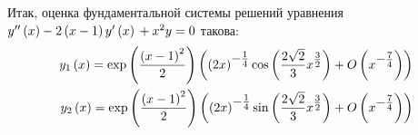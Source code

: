 \documentclass[a5paper,10pt]{article}
\begin{document}
Итак, оценка фундаментальной системы решений уравнения $y''\left(x\right) - 2\left(x - 1\right) y'\left(x\right) \\ + x^{2} y = 0$ такова:
\begin{align*}
    y_{1}\br{x} = \exp\br{\frac {\br{x - 1}^2} {2}} \br{ \tpow{\br{2x}} {-\frac {1} {4}} \cos\br{\frac {2\sqrt{2}} {3} \tpow{x} {\frac {3} {2}}} + O\br{ \tpow{x} {-\frac {7} {4}}}} \\
    y_{2}\br{x} = \exp\br{\frac {\br{x - 1}^2} {2}} \br{ \tpow{\br{2x}} {-\frac {1} {4}} \sin\br{\frac {2\sqrt{2}} {3} \tpow{x} {\frac {3} {2}}} + O\br{ \tpow{x} {-\frac {7} {4}}}}
\end{align*}
\end{document}
